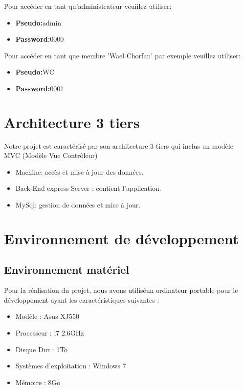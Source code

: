   Pour acc\'{e}der en tant qu'administrateur veuiilez utiliser:

  \begin{itemize}
    \item {\textbf{ Pseudo:}admin}
    \item {\textbf{ Password:}0000}
  \end{itemize}


  Pour acc\'{e}der en tant que membre 'Wael Chorfan' par exemple veuillez utiliser:

  \begin{itemize}
    \item {\textbf{ Pseudo:}WC}
    \item {\textbf{ Password:}0001}
  \end{itemize}

 \newpage



 \section{ Architecture 3 tiers}

Notre projet est caract\'{e}ris\'{e} par son architecture 3 tiers qui inclus un mod\`{e}le MVC (Mod\`{e}le
Vue Contr\^{o}leur)

\begin{itemize}
  \item { Machine: acc\`{e}s et mise \`{a} jour des donn\'{e}es.}
  \item {Back-End express Server : contient l'application.}
  \item {MySql: gestion de donn\'{e}es et mise \`{a} jour.}
  
\end{itemize}



\section{Environnement de d\'{e}veloppement}

  \subsection{Environnement mat\'{e}riel }

  Pour la r\'{e}alisation du projet, nous avons utilis\'{e}un ordinateur
  portable pour le d\'{e}veloppement ayant les caract\'{e}ristiques suivantes :

\begin{itemize}
  \item {  Mod\`{e}le : Asus XJ550 }
  \item {Processeur : i7 2.6GHz }
  \item {Disque Dur : 1To }
  \item { Syst\`{e}mes d'exploitation : Windows 7  }
  \item {M\'{e}moire : 8Go}

\end{itemize}






